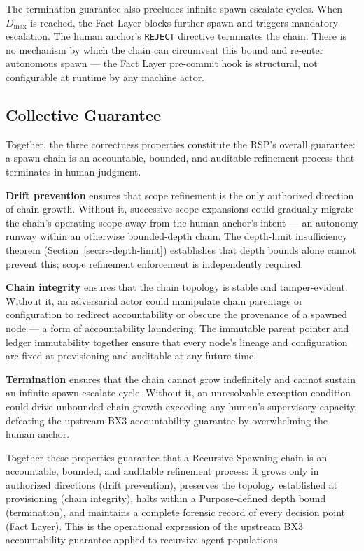 The termination guarantee also precludes infinite spawn-escalate cycles. When $D_{\mathrm{max}}$ is reached, the Fact Layer blocks further spawn and triggers mandatory escalation. The human anchor's \texttt{REJECT} directive terminates the chain. There is no mechanism by which the chain can circumvent this bound and re-enter autonomous spawn — the Fact Layer pre-commit hook is structural, not configurable at runtime by any machine actor.

\subsection{Collective Guarantee}
\label{sec:rs-collective-guarantee}

Together, the three correctness properties constitute the RSP's overall guarantee: a spawn chain is an accountable, bounded, and auditable refinement process that terminates in human judgment.

\textbf{Drift prevention} ensures that scope refinement is the only authorized direction of chain growth. Without it, successive scope expansions could gradually migrate the chain's operating scope away from the human anchor's intent — an autonomy runway within an otherwise bounded-depth chain. The depth-limit insufficiency theorem (Section~\ref{sec:rs-depth-limit}) establishes that depth bounds alone cannot prevent this; scope refinement enforcement is independently required.

\textbf{Chain integrity} ensures that the chain topology is stable and tamper-evident. Without it, an adversarial actor could manipulate chain parentage or configuration to redirect accountability or obscure the provenance of a spawned node — a form of accountability laundering. The immutable parent pointer and ledger immutability together ensure that every node's lineage and configuration are fixed at provisioning and auditable at any future time.

\textbf{Termination} ensures that the chain cannot grow indefinitely and cannot sustain an infinite spawn-escalate cycle. Without it, an unresolvable exception condition could drive unbounded chain growth exceeding any human's supervisory capacity, defeating the upstream BX3 accountability guarantee by overwhelming the human anchor.

Together these properties guarantee that a Recursive Spawning chain is an accountable, bounded, and auditable refinement process: it grows only in authorized directions (drift prevention), preserves the topology established at provisioning (chain integrity), halts within a Purpose-defined depth bound (termination), and maintains a complete forensic record of every decision point (Fact Layer). This is the operational expression of the upstream BX3 accountability guarantee applied to recursive agent populations.
